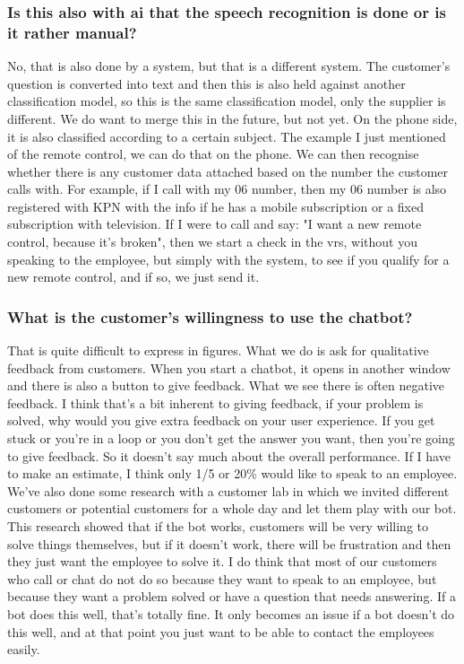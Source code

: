 \begin{appendices}
	\subsubsection{Is this also with \acrshort{ai} that the speech recognition is done or is it rather manual?}
	No, that is also done by a system, but that is a different system. The customer's question is converted into text and then this is also held against another classification model, so this is the same classification model, only the supplier is different. We do want to merge this in the future, but not yet. On the phone side, it is also classified according to a certain subject. The example I just mentioned of the remote control, we can do that on the phone. We can then recognise whether there is any customer data attached based on the number the customer calls with. For example, if I call with my 06 number, then my 06 number is also registered with KPN with the info if he has a mobile subscription or a fixed subscription with television. If I were to call and say: "I want a new remote control, because it's broken", then we start a check in the \acrfull{vrs}, without you speaking to the employee, but simply with the system, to see if you qualify for a new remote control, and if so, we just send it.
	
	\subsubsection{What is the customer's willingness to use the chatbot?}
	That is quite difficult to express in figures. What we do is ask for qualitative feedback from customers. When you start a chatbot, it opens in another window and there is also a button to give feedback. What we see there is often negative feedback. I think that's a bit inherent to giving feedback, if your problem is solved, why would you give extra feedback on your user experience. If you get stuck or you're in a loop or you don't get the answer you want, then you're going to give feedback. So it doesn't say much about the overall performance. If I have to make an estimate, I think only 1/5 or 20\% would like to speak to an employee. We've also done some research with a customer lab in which we invited different customers or potential customers for a whole day and let them play with our bot. This research showed that if the bot works, customers will be very willing to solve things themselves, but if it doesn't work, there will be frustration and then they just want the employee to solve it. I do think that most of our customers who call or chat do not do so because they want to speak to an employee, but because they want a problem solved or have a question that needs answering. If a bot does this well, that's totally fine. It only becomes an issue if a bot doesn't do this well, and at that point you just want to be able to contact the employees easily. 
	

\end{appendices}
